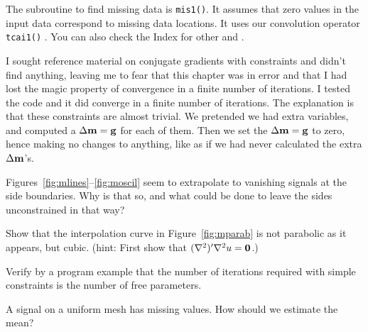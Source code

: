 \par
The subroutine to find missing data is \texttt{mis1()}.
It assumes that zero values in the input data
correspond to missing data locations.
It uses our convolution operator
\texttt{tcai1()} .
You can also check the Index for other
 and .
\noindent


\par
I sought reference material on conjugate gradients with constraints
and didn't find anything,
leaving me to fear that this chapter was in error
and that I had lost the magic property of convergence
in a finite number of iterations.
I tested the code and it did converge in a finite number of iterations.
The explanation is that these constraints are almost trivial.
We pretended we had extra variables,
and computed a $\Delta \bold m =\bold g$ for each of them.
Then we set the $\Delta \bold m =\bold g$ to zero,
hence making no changes to anything,
like as if we had never calculated the extra  $\Delta \bold m$'s.

\begin{exer}
\item
        Figures~\ref{fig:mlines}--\ref{fig:moscil}
        seem to extrapolate to vanishing signals at the side boundaries.
        Why is that so, and what could be done to leave the sides
        unconstrained in that way?
\item
        Show that the interpolation curve in Figure~\ref{fig:mparab} is not
        parabolic as it appears, but cubic.
        ({\sc hint}:  First show that $(\nabla^2)'\nabla^2 u = \bold 0$.)
        \item
        Verify by a program example that the number of iterations
        required with simple constraints is the number of free parameters.
\item
        A signal on a uniform mesh has missing values.
        How should we estimate the mean?
\end{exer}

